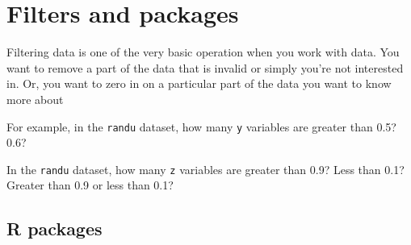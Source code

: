 \documentclass[
]{book}
\newenvironment{Shaded}{\begin{snugshade}}{\end{snugshade}}
\newcommand{\CommentTok}[1]{\textcolor[rgb]{0.56,0.35,0.01}{\textit{#1}}}
\newcommand{\FloatTok}[1]{\textcolor[rgb]{0.00,0.00,0.81}{#1}}
\newcommand{\FunctionTok}[1]{\textcolor[rgb]{0.00,0.00,0.00}{#1}}
\newcommand{\NormalTok}[1]{#1}
\newcommand{\OtherTok}[1]{\textcolor[rgb]{0.56,0.35,0.01}{#1}}
\newcommand{\SpecialCharTok}[1]{\textcolor[rgb]{0.00,0.00,0.00}{#1}}
\begin{document}
\hypertarget{filters-and-packages}{%
\chapter{Filters and packages}\label{filters-and-packages}}

Filtering data is one of the very basic operation when you work with data. You want to remove a part of the data that is invalid or simply you're not interested in. Or, you want to zero in on a particular part of the data you want to know more about

For example, in the \texttt{randu} dataset, how many \texttt{y} variables are greater than 0.5? 0.6?

\begin{Shaded}
\end{Shaded}

In the \texttt{randu} dataset, how many \texttt{z} variables are greater than 0.9? Less than 0.1? Greater than 0.9 or less than 0.1?

\begin{Shaded}
\end{Shaded}

\hypertarget{r-packages}{%
\section{R packages}\label{r-packages}}
\end{document}
